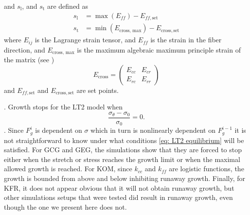 and $s_\mathrm{l}$, and $s_\mathrm{t}$ are defined as
\begin{align*}
    s_\mathrm{l} &= \max(E_{ff}) - E_{ff, \mathrm{set}} \\
    s_\mathrm{t} &= \min(E_\text{cross, max}) - E_\mathrm{cross, set}
\end{align*}
where $E_{ij}$ is the Lagrange strain tensor, and $E_{ff}$ is the strain in the fiber direction, and $E_\text{cross, max}$ is the maximum algebraic maximum principle strain of the matrix (see \citep{Witzenburg2018})
\begin{equation*}
    E_\text{cross} = \begin{pmatrix}
        E_{cc} & E_{cr} \\
        E_{rc} & E_{rr}
    \end{pmatrix}
\end{equation*}
and $E_{ff, \mathrm{set}}$ and $E_\mathrm{cross, set}$ are set points. \par
{}\citep{Witzenburg2018}. Growth stops for the LT2 model when \begin{equation}
\label{eq: LT2 equilibrium}
    \frac{\sigma_{\theta} - \sigma_{0}}{\sigma_{0}} = 0.
\end{equation}
 \citep{Witzenburg2018}. Since $F_g^i$ is dependent on $\sigma$ which in turn is nonlinearly dependent on $F_g^{i-1}$ it is not straightforward to know under what conditions \ref{eq: LT2 equilibrium} will be satisfied. For GCG and GEG, the simulations show that they are forced to stop either when the stretch or stress reaches the growth limit or when the maximal allowed growth is reached. For KOM, since $k_{cc}$ and $k_{ff}$ are logistic functions, the growth is bounded from above and below inhibiting runaway growth. Finally, for KFR, it does not appear obvious that it will not obtain runaway growth, but other simulations setups that were tested did result in runaway growth, even though the one we present here does not.
